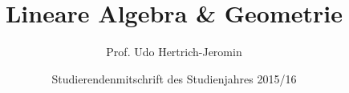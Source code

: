 \documentclass[a4paper, fontsize=11pt, DIV=12, parskip=half]{scrreprt}
\author{Studierendenmitschrift des Studienjahres 2015/16}
\title{Lineare Algebra \& Geometrie}
\subtitle{Prof. Udo Hertrich-Jeromin}
\begin{document}
\maketitle
\tableofcontents

































\small
\printindex
\end{document}

